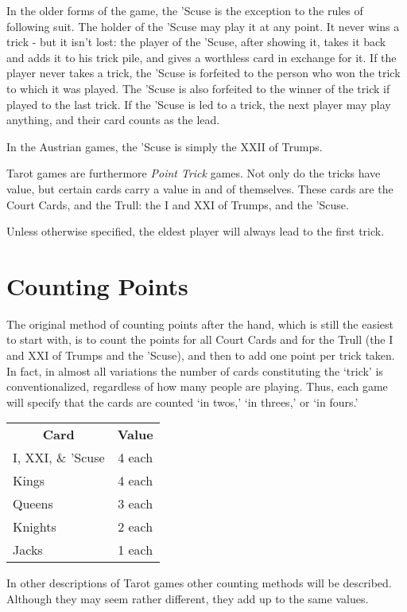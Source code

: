 \documentclass[ebook,12pt,twoside,openright,extrafontsizes,final]{memoir}
\begin{document}
In the older forms of the game, the ’Scuse is the exception to the rules of
following suit.  The holder of the ’Scuse may play it at any point. It never
wins a trick - but it isn’t lost: the player of the ’Scuse, after showing it,
takes it back and adds it to his trick pile, and gives a worthless card in
exchange for it.  If the player never takes a trick, the ’Scuse is forfeited
to the person who won the trick to which it was played.  The ’Scuse is also
forfeited to the winner of the trick if played to the last trick.  If the 
’Scuse is led to a trick, the next player may play anything, and their card
counts as the lead.

In the Austrian games, the ’Scuse is simply the XXII of Trumps.

Tarot games are furthermore \emph{Point Trick} games.  Not only do the tricks
have value, but certain cards carry a value in and of themselves.
These cards are the Court Cards, and the Trull: the I and XXI of Trumps,
and the ’Scuse.

Unless otherwise specified, the eldest player will always lead to the first
trick.


\section{Counting Points}
The original method of counting points after the hand, which is still the easiest
to start with, is to count the points for all Court Cards and for the Trull (the I
and XXI of Trumps and the ’Scuse), and then to add one point per trick taken.  In 
fact, in almost all variations the number of cards constituting the ‘trick’ is 
conventionalized, regardless of how many people are playing. Thus, each game will 
specify that the cards are counted ‘in twos,’ ‘in threes,’ or ‘in fours.’

\begin{table}[]
\centering
\begin{tabular}{lc}
\multicolumn{1}{c}{\textbf{Card}} & \textbf{Value} \\
I, XXI, \& ’Scuse & 4 each\\
Kings & 4 each \\
Queens & 3 each\\
Knights & 2 each\\
Jacks & 1 each
\end{tabular}
\end{table}

In other descriptions of Tarot games other counting methods will be described. Although
they may seem rather different, they add up to the same values.
\end{document}
